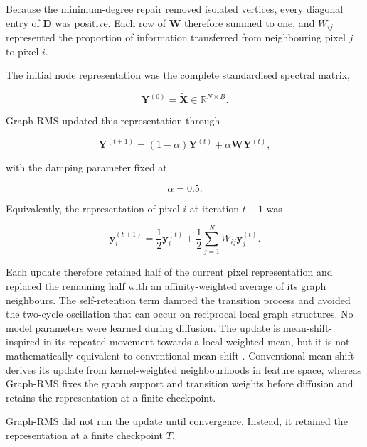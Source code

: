 \documentclass[10pt,a4paper,fleqn]{article}
\begin{document}
Because the minimum-degree repair removed isolated vertices, every diagonal
entry of \(\mathbf{D}\) was positive. Each row of \(\mathbf{W}\) therefore
summed to one, and \(W_{ij}\) represented the proportion of information
transferred from neighbouring pixel \(j\) to pixel \(i\).

The initial node representation was the complete standardised spectral matrix,

\begin{equation}
\mathbf{Y}^{(0)}
=
\widetilde{\mathbf{X}}
\in
\mathbb{R}^{N\times B}.
\label{eq:diffusion_initialisation}
\end{equation}

Graph-RMS updated this representation through

\begin{equation}
\mathbf{Y}^{(t+1)}
=
(1-\alpha)\mathbf{Y}^{(t)}
+
\alpha\mathbf{W}\mathbf{Y}^{(t)},
\label{eq:damped_diffusion}
\end{equation}

with the damping parameter fixed at

\begin{equation}
\alpha=0.5.
\label{eq:diffusion_alpha}
\end{equation}

Equivalently, the representation of pixel \(i\) at iteration \(t+1\) was

\begin{equation}
\mathbf{y}^{(t+1)}_i
=
\frac{1}{2}\mathbf{y}^{(t)}_i
+
\frac{1}{2}
\sum_{j=1}^{N}
W_{ij}\mathbf{y}^{(t)}_j.
\label{eq:node_diffusion}
\end{equation}

Each update therefore retained half of the current pixel representation and
replaced the remaining half with an affinity-weighted average of its graph
neighbours. The self-retention term damped the transition process and avoided
the two-cycle oscillation that can occur on reciprocal local graph structures.
No model parameters were learned during diffusion. The update is
mean-shift-inspired in its repeated movement towards a local weighted mean, but
it is not mathematically equivalent to conventional mean shift
\citep{cheng1995,comaniciu2002}. Conventional mean shift derives its update
from kernel-weighted neighbourhoods in feature space, whereas Graph-RMS fixes
the graph support and transition weights before diffusion and retains the
representation at a finite checkpoint.

Graph-RMS did not run the update until convergence. Instead, it retained the
representation at a finite checkpoint \(T\),
\end{document}
